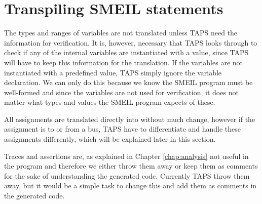 \section{Transpiling SMEIL statements}

The types and ranges of variables are not translated unless TAPS need the information for verification. It is, however, necessary that TAPS looks through to check if any of the internal variables are instantiated with a value, since TAPS will have to keep this information for the translation. If the variables are not instantiated with a predefined value, TAPS simply ignore the variable declaration. We can only do this because we know the SMEIL program must be well-formed and since the variables are not used for verification, it does not matter what types and values the SMEIL program expects of these.

All assignments are translated directly into \cspm{} without much change, however if the assignment is to or from a bus, TAPS have to differentiate and handle these assignments differently, which will be explained later in this section.

%


Traces and assertions are, as explained in Chapter \ref{chap:analysis} not useful in the \cspm{} program and therefore we either throw them away or keep them as comments for the sake of understanding the generated code. Currently TAPS throw them away, but it would be a simple task to change this and add them as comments in the generated \cspm{} code.

